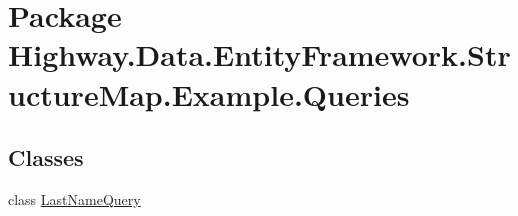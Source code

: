 \hypertarget{namespace_highway_1_1_data_1_1_entity_framework_1_1_structure_map_1_1_example_1_1_queries}{\section{Package Highway.\-Data.\-Entity\-Framework.\-Structure\-Map.\-Example.\-Queries}
\label{namespace_highway_1_1_data_1_1_entity_framework_1_1_structure_map_1_1_example_1_1_queries}
}
\subsection*{Classes}
\begin{DoxyCompactItemize}
\item 
class \hyperlink{class_highway_1_1_data_1_1_entity_framework_1_1_structure_map_1_1_example_1_1_queries_1_1_last_name_query}{Last\-Name\-Query}
\end{DoxyCompactItemize}
